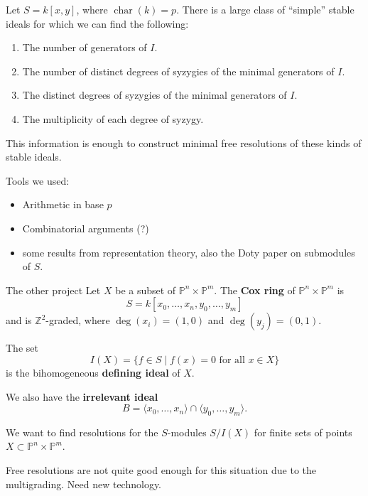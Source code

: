 \documentclass[mathserif
, handout
]{beamer}
\DeclareMathOperator{\Char}{char}
\newcommand{\PP}{\mathbb P}
\newcommand{\ZZ}{\mathbb Z}
\begin{document}
\begin{frame}
    \begin{theorem}
        [C-D-G-G-P-S, 2023+]
        Let $S = k[x,y]$, where $\Char(k) = p$.
        There is a large class of ``simple'' stable ideals for which we can find the following:
        \begin{enumerate}
        \item The number of generators of $I$.
           \item The number of distinct degrees of syzygies of the minimal generators of $I$.
            \item The distinct degrees of syzygies of the minimal generators of $I$.
         
            \item The multiplicity of each degree of syzygy.
            
        \end{enumerate}
    \end{theorem}
    This information is enough to construct minimal free resolutions of these kinds of stable ideals.
\end{frame}

\begin{frame}

    Tools we used: 
    \begin{itemize}
    \item Arithmetic in base $p$
    \item Combinatorial arguments (?)
    \item some results from representation theory, also the Doty paper on submodules of $S$.
    \end{itemize}
\end{frame}

\begin{frame}{The other project}
    Let $X$ be a subset of $\PP^n\times \PP^m$. 
    The \textbf{Cox ring} of $\PP^n\times \PP^m$ is 
    \[
    S = k[x_0,\dots,x_n,y_0,\dots,y_m]
    \]
    and is $\ZZ^2$-graded, where \(\deg(x_i) = (1,0)\) and \(\deg(y_j) = (0,1)\).
    
    The set
\[I(X) = \{f\in S\mid f(x) = 0\text{ for all } x\in X\}\] is the bihomogeneous \textbf{defining ideal} of $X$.

We also have the \textbf{irrelevant ideal} 
\[B=\langle x_0,\dots,x_n\rangle \cap \langle y_0,\dots,y_m \rangle.\]
\end{frame}

\begin{frame}
    We want to find resolutions for the $S$-modules $S/I(X)$ for finite sets of points $X\subset \PP^n\times\PP^m$.

    Free resolutions are not quite good enough for this situation due to the multigrading. Need new technology.
\end{frame}
\end{document}
